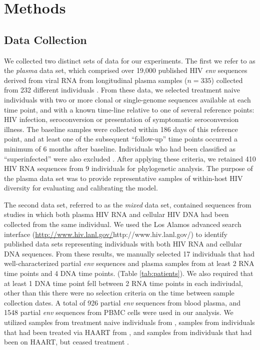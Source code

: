 \documentclass[12pt]{article}
\begin{document}

\section * {Methods} \label{sec:methods}



\subsection * {Data Collection} \label{subsec:dcollection}
We collected two distinct sets of data for our experiments. 
The first we refer to as the {\em plasma} data set, which comprised over 19,000 published HIV \textit{env} sequences derived from viral RNA from longitudinal plasma samples ($n=335$) collected from 232 different individuals \citep{McCloskey14}. 
From these data, we selected treatment naive individuals with two or more clonal or single-genome sequences available at each time point, and with a known time-line relative to one of several reference points: HIV infection, seroconversion or presentation of symptomatic seroconversion illness. 
The baseline samples were collected within 186 days of this reference point, and at least one of the subsequent ``follow-up'' time points occurred a minimum of 6 months after baseline.
Individuals who had been classified as ``superinfected'' were also excluded \citep{McCloskey14}.
After applying these criteria, we retained 410 HIV RNA sequences from 9 individuals for phylogenetic analysis.
The purpose of the plasma data set was to provide representative samples of within-host HIV diversity for evaluating and calibrating the model.

The second data set, referred to as the {\em mixed} data set, contained sequences from studies in which both plasma HIV RNA and cellular HIV DNA had been collected from the same individual.
We used the Los Alamos advanced search interface (\url{http://www.hiv.lanl.gov/}{http://www.hiv.lanl.gov/}) to identify published data sets representing individuals with both HIV RNA and cellular DNA sequences.
From these results, we manually selected 17 individuals that had well-characterized partial {\em env} sequences and plasma samples from at least 2 RNA time points and 4 DNA time points. (Table \ref{tab:patients}). 
We also required that at least 1 DNA time point fell between 2 RNA time points in each indiviudal, other than this there were no selection criteria on the time between sample collection dates. 
A total of 926 partial {\em env} sequences from blood plasma, and 1548 partial {\em env} sequences from PBMC cells were used in our analysis. 
We utilized samples from treatment naive individuals from \cite{Shankarappa99, Novitsky09}, samples from individuals that had been treated via HAART from \cite{Llewellyn06}, and samples from individuals that had been on HAART, but ceased treatment \cite{Fischer04}. 
\end{document}
